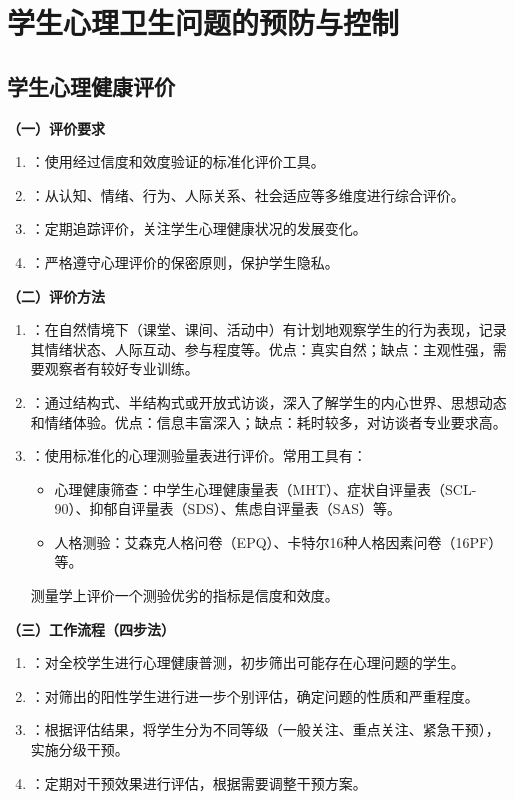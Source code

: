 \section{学生心理卫生问题的预防与控制}

\subsection{学生心理健康评价}

\begin{keybox}
\textbf{（一）评价要求}

\begin{enumerate}[leftmargin=*]
    \item {}：使用经过信度和效度验证的标准化评价工具。
    \item {}：从认知、情绪、行为、人际关系、社会适应等多维度进行综合评价。
    \item {}：定期追踪评价，关注学生心理健康状况的发展变化。
    \item {}：严格遵守心理评价的保密原则，保护学生隐私。
\end{enumerate}

\textbf{（二）评价方法}

\begin{enumerate}[leftmargin=*]
    \item {}：在自然情境下（课堂、课间、活动中）有计划地观察学生的行为表现，记录其情绪状态、人际互动、参与程度等。优点：真实自然；缺点：主观性强，需要观察者有较好专业训练。
    \item {}：通过结构式、半结构式或开放式访谈，深入了解学生的内心世界、思想动态和情绪体验。优点：信息丰富深入；缺点：耗时较多，对访谈者专业要求高。
    \item {}：使用标准化的心理测验量表进行评价。常用工具有：
    \begin{itemize}
        \item 心理健康筛查：中学生心理健康量表（MHT）、症状自评量表（SCL-90）、抑郁自评量表（SDS）、焦虑自评量表（SAS）等。
        \item 人格测验：艾森克人格问卷（EPQ）、卡特尔16种人格因素问卷（16PF）等。
    \end{itemize}
    测量学上评价一个测验优劣的指标是信度和效度。
\end{enumerate}

\textbf{（三）工作流程（四步法）}

\begin{enumerate}[leftmargin=*]
    \item {}：对全校学生进行心理健康普测，初步筛出可能存在心理问题的学生。
    \item {}：对筛出的阳性学生进行进一步个别评估，确定问题的性质和严重程度。
    \item {}：根据评估结果，将学生分为不同等级（一般关注、重点关注、紧急干预），实施分级干预。
    \item {}：定期对干预效果进行评估，根据需要调整干预方案。
\end{enumerate}


\end{keybox}
